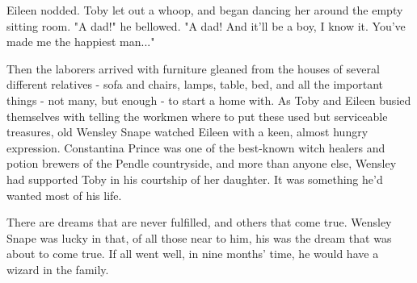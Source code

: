 Eileen nodded. Toby let out a whoop, and began dancing her around the empty sitting room. "A dad!" he bellowed. "A dad! And it'll be a boy, I know it. You've made me the happiest man..."

Then the laborers arrived with furniture gleaned from the houses of several different relatives - sofa and chairs, lamps, table, bed, and all the important things - not many, but enough - to start a home with. As Toby and Eileen busied themselves with telling the workmen where to put these used but serviceable treasures, old Wensley Snape watched Eileen with a keen, almost hungry expression. Constantina Prince was one of the best-known witch healers and potion brewers of the Pendle countryside, and more than anyone else, Wensley had supported Toby in his courtship of her daughter. It was something he'd wanted most of his life.

There are dreams that are never fulfilled, and others that come true. Wensley Snape was lucky in that, of all those near to him, his was the dream that was about to come true. If all went well, in nine months' time, he would have a wizard in the family.
